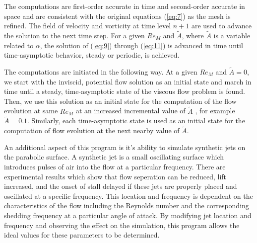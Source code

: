 The computations are first-order accurate in time and second-order accurate in space and are consistent with the original equations (\ref{eq:7}) as the mesh is refined. The field of velocity and vorticity at time level $n+1$ are used to advance the solution to the next time step. For a given $Re_M$ and $\tilde{A}$, where $\tilde{A}$ is a variable related to $\alpha$, the solution of (\ref{eq:9}) through (\ref{eq:11}) is advanced in time until time-asymptotic behavior, steady or periodic, is achieved.

The computations are initiated in the following way. At a given $Re_M$ and $\tilde{A} = 0$, we start with the inviscid, potential flow solution as an initial state and march in time until a steady, time-asymptotic state of the viscous flow problem is found. Then, we use this solution as an initial state for the computation of the flow evolution at same $Re_M$ at an increased incremental value of $\tilde{A}$ , for example $\tilde{A} = 0.1$. Similarly, each time-asymptotic state is used as an initial state for the computation of flow evolution at the next nearby value of $\tilde{A}$.

An additional aspect of this program is it's ability to simulate synthetic jets on the parabolic surface. A synthetic jet is a small oscillating surface which introduces pulses of air into the flow at a particular frequency. There are experimental results which show that flow seperation can be reduced, lift increased, and the onset of stall delayed if these jets are properly placed and oscillated at a specific frequency. This location and frequency is dependent on the characteristics of the flow including the Reynolds number and the corresponding shedding frequency at a particular angle of attack. By modifying jet location and frequency and observing the effect on the simulation, this program allows the ideal values for these parameters to be determined.
